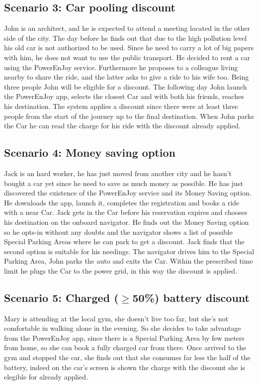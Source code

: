 \subsection{Scenario 3: Car pooling discount}
John is an architect, and he is expected to attend a meeting located in the other side of the city. The day before he finds out that due to the high pollution level his old car is not authorized to be used. Since he need to carry a lot of big papers with him, he does not want to use the public transport. He decided to rent a car using the PowerEnJoy service. Furthermore he proposes to a colleague living nearby to share the ride, and the latter asks to give a ride to his wife too. Being three people John will be eligible for a discount. The following day John launch the PowerEnJoy app, selects the closest Car and with both his friends, reaches his destination. The system applies a discount since there were at least three people from the start of the journey up to the final destination. When John parks the Car he can read the charge for his ride with the discount already applied.
\subsection{Scenario 4: Money saving option}
Jack is an hard worker, he has just moved from another city and he hasn't bought a car yet since he need to save as much money as possible. He has just discovered the existence of the PowerEnJoy service and its Money Saving option. He downloads the app, launch it, completes the registration and books a ride with a near Car. Jack gets in the Car before his reservation expires and chooses his destination on the onboard navigator. He finds out the Money Saving option so he opts-in without any doubts and the navigator shows a list of possible Special Parking Areas where he can park to get a discount. Jack finds that the second option is suitable for his needings. The navigator drives him to the Special Parking Area, John parks the auto and exits the Car. Within the prescribed time limit he plugs the Car to the power grid, in this way the discount is applied. 
\subsection{Scenario 5: Charged ($\geq$50\%) battery discount}
Mary is attending at the local gym, she doesn't live too far, but she's not comfortable in walking alone in the evening. So she decides to take advantage from the PowerEnJoy app, since there is a Special Parking Area by few meters from home, so she can book a fully charged car from there. Once arrived to the gym and stopped the car, she finds out that she consumes far less the half of the battery, indeed on the car's screen is shown the charge with the discount she is elegible for already applied. %
